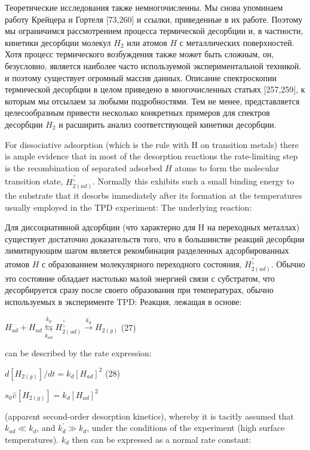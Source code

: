\documentclass[11pt]{article}
\begin{document}
    Теоретические исследования также немногочисленны. Мы снова упоминаем
работу Крейцера и Гортеля {[}73,260{]} и ссылки, приведенные в их
работе. Поэтому мы ограничимся рассмотрением процесса термической
десорбции и, в частности, кинетики десорбции молекул \(H_2\) или атомов
\(H\) с металлических поверхностей. Хотя процесс термического
возбуждения также может быть сложным, он, безусловно, является наиболее
часто используемой экспериментальной техникой. и поэтому существует
огромный массив данных. Описание спектроскопии термической десорбции в
целом приведено в многочисленных статьях {[}257,259{]}, к которым мы
отсылаем за любыми подробностями. Тем не менее, представляется
целесообразным привести несколько конкретных примеров для спектров
десорбции \(H_2\) и расширить анализ соответствующей кинетики десорбции.

    For dissociative adsorption (which is the rule with H on transition
metals) there is ample evidence that in most of the desorption reactions
the rate-limiting step is the recombination of separated adsorbed \(H\)
atoms to form the molecular transition state,
\(H_{2(ad)}^{{}_{+}^{+}}\). Normally this exhibits such a small binding
energy to the substrate that it desorbs immediately after its formation
at the temperatures usually employed in the TPD experiment: The
underlying reaction:

    Для диссоциативной адсорбции (что характерно для H на переходных
металлах) существует достаточно доказательств того, что в большинстве
реакций десорбции лимитирующим шагом является рекомбинация разделенных
адсорбированных атомов \(H\) с образованием молекулярного переходного
состояния, \(H_{2(ad)}^{{}_{+}^{+}}\). Обычно это состояние обладает
настолько малой энергией связи с субстратом, что десорбируется сразу
после своего образования при температурах, обычно используемых в
эксперименте TPD: Реакция, лежащая в основе:

    \(H_{ad} + H_{ad} \underset{k_{ad}}{\overset{k_d}{\leftrightarrows}} H_{2(ad)}^{{}_{+}^{+}}\overset{k_d^{\prime}}{\rightarrow}H_{2(g)}\)
(27)

    can be described by the rate expression:

    \(d\left[ H_{2(g)} \right] \big / dt = k_d \left[ H_{ad} \right]^2\)
(28)

    \(s_0\overset{-}c\left[ H_{2(g)} \right] = k_d \left[ H_{ad} \right]^2\)

    (apparent second-order desorption kinetics), whereby it is tacitly
assumed that \(k_{ad} \ll k_d\), and \(k_{d}^{\prime} \gg k_d\), under
the conditions of the experiment (high surface temperatures). \(k_d\)
then can be expressed as a normal rate constant:
\end{document}
